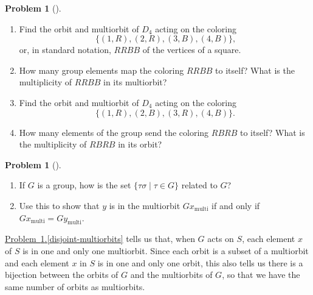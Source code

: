 \documentclass[10pt,]{book}
\theoremstyle{plain}
\theoremstyle{definition}
\newtheorem{activity}[project]{Problem}
\theoremstyle{definition}
\numberwithin{equation}{chapter}
\begin{document}
\begin{activity}[]\marginsymbol[-1em]{} \label{activity-291}
\leavevmode%
\begin{enumerate}[font=\bfseries,label=(\alph*),ref=\alph*]
\item\label{task-219} \marginsymbol[-2.5em]{} Find the orbit and multiorbit of \(D_4\) acting on the coloring%
\begin{equation*}
\{(1,R),(2,R),(3,B),(4,B)\}\text{,}
\end{equation*}
or, in standard notation, \(RRBB\) of the vertices of a square.%
\item\label{task-220} \marginsymbol[-2.5em]{} How many group elements map the coloring \(RRBB\) to itself? What is the multiplicity of \(RRBB\) in its multiorbit?%
\item\label{task-221} \marginsymbol[-2.5em]{} Find the orbit and multiorbit of \(D_4\) acting on the coloring%
\begin{equation*}
\{(1,R),(2,B),(3,R),(4,B)\}\text{.}
\end{equation*}
%
\item\label{task-222} \marginsymbol[-2.5em]{} How many elements of the group send the coloring \(RBRB\) to itself? What is the multiplicity of \(RBRB\) in its orbit?%
\end{enumerate}
\end{activity}
\begin{activity}[]\marginsymbol[-1em]{} \label{activity-292}
\leavevmode%
\begin{enumerate}[font=\bfseries,label=(\alph*),ref=\alph*]
\item\label{compose-right} \marginsymbol[-2.5em]{} If \(G\) is a group, how is the set \(\{\tau\sigma\mid\tau\in G\}\) related to \(G\)?%
\item\label{disjoint-multiorbits} \marginsymbol[-2.5em]{} Use this to show that \(y\) is in the multiorbit \(Gx_{\text{multi}}\) if and only if \(Gx_{\text{multi}} = Gy_{\text{multi}}\).%
\end{enumerate}
\end{activity}
\hyperref[disjoint-multiorbits]{Problem~\ref{activity-292}.\ref{disjoint-multiorbits}} tells us that, when \(G\) acts on \(S\), each element \(x\) of \(S\) is in one and only one multiorbit. Since each orbit is a subset of a multiorbit and each element \(x\) in \(S\) is in one and only one orbit, this also tells us there is a bijection between the orbits of \(G\) and the multiorbits of \(G\), so that we have the same number of orbits as multiorbits.%
\par
\end{document}
